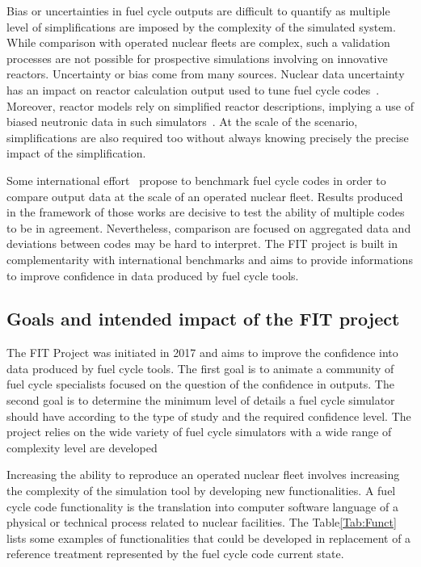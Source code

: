 Bias or uncertainties in fuel cycle outputs are difficult to quantify as
multiple level of simplifications are imposed by the complexity of the simulated
system. While comparison with operated nuclear fleets are complex, such a
validation processes are not possible for prospective simulations involving on
innovative reactors. Uncertainty or bias come from many sources. Nuclear data
uncertainty has an impact on reactor calculation output used to tune fuel cycle
codes~\cite{Krivtchik_2014}. Moreover, reactor models rely on simplified reactor
descriptions, implying a use of biased neutronic data in such
simulators~\cite{Somaini_2017}.  At the scale of the scenario, simplifications
are also required too without always knowing precisely the precise impact of the
simplification. 

Some international effort~\cite{NEA2016} propose to benchmark fuel cycle codes
in order to compare output data at the scale of an operated nuclear fleet.
Results produced in the framework of those works are decisive to test the
ability of multiple codes to be in agreement. Nevertheless, comparison are
focused on aggregated data and deviations between codes may be hard to
interpret. The FIT project is built in complementarity with international
benchmarks and aims to provide informations to improve confidence in data
produced by fuel cycle tools.

\subsection{Goals and intended impact of the FIT project}

The FIT Project was initiated in 2017 and aims to improve the confidence into
data produced by fuel cycle tools. The first goal is to animate a community of
fuel cycle specialists focused on the question of the confidence in outputs. The
second goal is to determine the minimum level of details a fuel cycle simulator
should have according to the type of study and the required confidence level.
The project relies on the wide variety of fuel cycle simulators with a wide
range of complexity level are developed

Increasing the ability to reproduce an operated nuclear fleet involves
increasing the complexity of the simulation tool by developing new
functionalities. A fuel cycle code functionality is the translation into
computer software language of a physical or technical process related to nuclear
facilities. The Table\ref{Tab:Funct} lists some examples of functionalities that
could be developed in replacement of a reference treatment represented by the
fuel cycle code current state.

